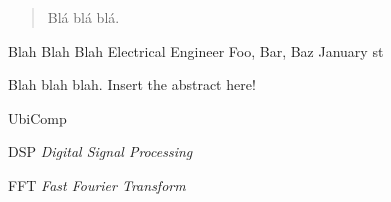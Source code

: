 \documentclass[tg]{mdtufsm}
\begin{document}
\begin{abstract}
Blá blá blá.
\end{abstract}

\begin{englishabstract}
{Blah Blah Blah}
{Electrical Engineer}
{Foo, Bar, Baz}
{January}
{st}

Blah blah blah. Insert the abstract here!
\end{englishabstract}


\listoffigures

\listoftables


\listofannex

\begin{listofabbrv}{UbiComp}
\item [DSP] \textit{Digital Signal Processing}
\item[FFT] \textit{Fast Fourier Transform}
\end{listofabbrv}
\end{document}
